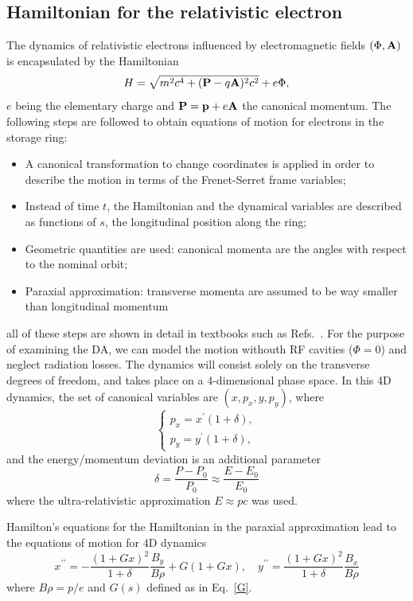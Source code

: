 \subsection{Hamiltonian for the relativistic electron}
The dynamics of relativistic electrons influenced by electromagnetic fields $(\Phi, \vb{A})$ is encapsulated by the Hamiltonian
    \begin{equation*}
        H=\sqrt{m^2c^4+(\vb{P}-q\vb{A})^2c^2}+e\Phi,
    \end{equation*}
 $e$ being the elementary charge and $\vb{P}=\vb{p}+e\vb{A}$ the canonical momentum. The following steps are followed to obtain equations of motion for electrons in the storage ring:
 \begin{itemize}
    \item A canonical transformation to change coordinates is applied in order to describe the motion in terms of the Frenet-Serret frame variables;
    \item Instead of time $t$, the Hamiltonian and the dynamical variables are described as functions of $s$, the longitudinal position along the ring;
    \item Geometric quantities are used: canonical momenta are the angles with respect to the nominal orbit;
    \item Paraxial approximation: transverse momenta are assumed to be way smaller than longitudinal momentum
 \end{itemize}
 all of these steps are shown in detail in textbooks such as  Refs.~\cite{lee, wiedemann,  wolski2014beam}. For the purpose of examining the DA, we can model the motion withouth RF cavities ($\Phi=0$) and neglect radiation losses. The dynamics will consist solely on the transverse degrees of freedom, and takes place on a 4-dimensional phase space. In this 4D dynamics, the set of canonical variables are $(x,p_{x},y , p_{y})$, where
\begin{equation}\begin{cases} p_{x}= x^\prime(1+\delta),\\p_{y}=y^\prime (1+\delta),\end{cases}\end{equation}
and the energy/momentum deviation is an additional parameter
\begin{equation}
    \delta = \frac{P-P_{0}}{P_{0}}\approx\frac{E-E_0}{E_0}
\end{equation}
where the ultra-relativistic approximation $E\approx pc$ was used.

Hamilton's equations for the Hamiltonian in the paraxial approximation lead to the equations of motion for 4D dynamics
\begin{equation}
x^{\prime \prime}=-\frac{(1+G x)^{2}}{1+\delta} \frac{B_{y}}{B \rho}+G(1+G x),
\quad
y^{\prime \prime}=\frac{(1+G x)^{2}}{1+\delta} \frac{B_{x}}{B \rho}
\end{equation}
where $B\rho = p/e$ and $G(s)$ defined as in Eq.~\eqref{G}.
